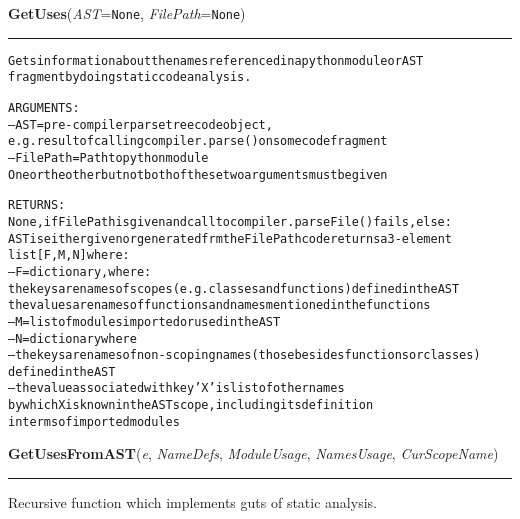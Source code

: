     \label{System:StaticAnalysis:GetUses}

    \vspace{0.5ex}

\hspace{.8\funcindent}\begin{boxedminipage}{\funcwidth}

    \raggedright \textbf{GetUses}(\textit{AST}={\tt None}, \textit{FilePath}={\tt None})

    \vspace{-1.5ex}

    \rule{\textwidth}{0.5\fboxrule}
\setlength{\parskip}{2ex}
\begin{alltt}

Gets information about the names referenced in a python module or AST
fragment by doing static code analysis. 

ARGUMENTS:
--AST = pre-compiler parse tree code object, 
        e.g. result of calling compiler.parse() on some code fragment
--FilePath = Path to python module
One or the other but not both of these two arguments must be given
        
RETURNS:
None, if FilePath is given and call to compiler.parseFile() fails, else:
AST is either given or generated frm the FilePath code returns a 3-element
list [F,M,N] where:
---F = dictionary, where:
        the keys are names of scopes (e.g. classes and functions) defined in the AST
        the values are names of functions and names mentioned in the functions
--M = list of modules imported or used in the AST
--N = dictionary where
        -- the keys are names of non-scoping names (those besides functions or classes) 
        defined in the AST
        -- the value associated with key 'X' is list of other names
        by which X is known in the AST scope, including its definition
        in terms of imported modules
\end{alltt}

\setlength{\parskip}{1ex}
    \end{boxedminipage}

    \label{System:StaticAnalysis:GetUsesFromAST}

    \vspace{0.5ex}

\hspace{.8\funcindent}\begin{boxedminipage}{\funcwidth}

    \raggedright \textbf{GetUsesFromAST}(\textit{e}, \textit{NameDefs}, \textit{ModuleUsage}, \textit{NamesUsage}, \textit{CurScopeName})

    \vspace{-1.5ex}

    \rule{\textwidth}{0.5\fboxrule}
\setlength{\parskip}{2ex}
    Recursive function which implements guts of static analysis.

\setlength{\parskip}{1ex}
    \end{boxedminipage}

